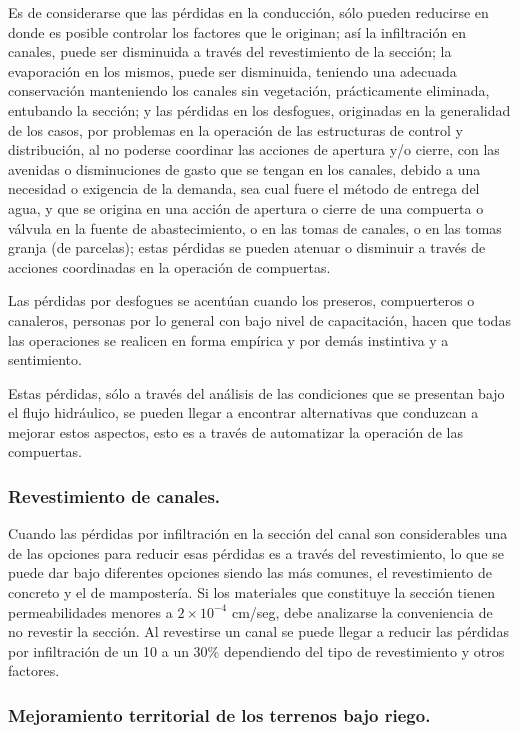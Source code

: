 Es de considerarse que las pérdidas en la conducción, sólo pueden reducirse en
donde es posible controlar los factores que le originan; así la infiltración en canales, puede
ser disminuida a través del revestimiento de la sección; la evaporación en los mismos,
puede ser disminuida, teniendo una adecuada conservación manteniendo los canales sin
vegetación, prácticamente eliminada, entubando la sección; y las pérdidas en los
desfogues, originadas en la generalidad de los casos, por problemas en la operación de
las estructuras de control y distribución, al no poderse coordinar las acciones de apertura
y/o cierre, con las avenidas o disminuciones de gasto que se tengan en los canales,
debido a una necesidad o exigencia de la demanda, sea cual fuere el método de entrega
del agua, y que se origina en una acción de apertura o cierre de una compuerta o válvula
en la fuente de abastecimiento, o en las tomas de canales, o en las tomas granja (de
parcelas); estas pérdidas se pueden atenuar o disminuir a través de acciones coordinadas
en la operación de compuertas.

Las pérdidas por desfogues se acentúan cuando los preseros, compuerteros o
canaleros, personas por lo general con bajo nivel de capacitación, hacen que todas las
operaciones se realicen en forma empírica y por demás instintiva y a sentimiento.

Estas pérdidas, sólo a través del análisis de las condiciones que se presentan bajo el flujo
hidráulico, se pueden llegar a encontrar alternativas que conduzcan a mejorar estos
aspectos, esto es a través de automatizar la operación de las compuertas.

\subsubsection{Revestimiento de canales.}

Cuando las pérdidas por infiltración en la sección del canal son considerables
una de las opciones para reducir esas pérdidas es a través del revestimiento, lo que se
puede dar bajo diferentes opciones siendo las más comunes, el revestimiento de
concreto y el de mampostería. Si los materiales que constituye la sección tienen
permeabilidades menores a $2\times 10^{-4}$ cm/seg, debe analizarse la conveniencia de no
revestir la sección. Al revestirse un canal se puede llegar a reducir las pérdidas por
infiltración de un 10 a un 30\% dependiendo del tipo de revestimiento y otros factores.


\subsubsection{Mejoramiento territorial de los terrenos bajo riego.}

